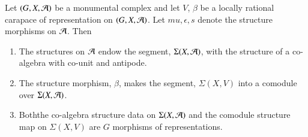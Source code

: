 \begin{secprop}\label{chap6-proposition-13.2}
Let $(G, X, \mathcal{A})$ be a monumental complex and let $V$, $\beta$ be a locally rational carapace of representation on $(G, X, \mathcal{A})$. Let $mu, \epsilon, s$ denote the structure morphisms on $\mathcal{A}$. Then
\begin{enumerate}[(1)]
\item The structures on $\mathcal{A}$ endow the segment, $\Sigma(X, \mathcal{A})$, with the structure of a co-algebra with co-unit and antipode.\label{chap6-proposition13.2-enum-1}

\item The structure morphism, $\beta$, makes the segment, $\Sigma(X, V)$ into a comodule
 over $\Sigma(X, \mathcal{A})$.\label{chap6-proposition13.2-enum-2}

 \item Both\pageoriginale the co-algebra structure data on $\Sigma(X, \mathcal{A})$ and the comodule structure map on $\Sigma(X, V)$ are $G$ morphisms of representations.\label{chap6-proposition13.2-enum-3}
\end{enumerate}
\end{secprop}

